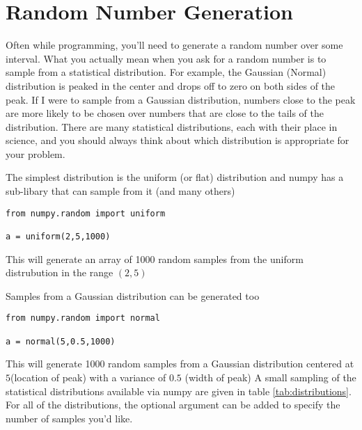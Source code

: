 \section{Random Number Generation}
Often while programming, you'll need to generate a random number over
some interval.  What you actually mean when you ask for a random
number is to sample from a statistical distribution.  For example, the
Gaussian (Normal) distribution is peaked in the center and drops off
to zero on both sides of the peak.  If I were to sample from a Gaussian
distribution, numbers close to the peak are more likely to be chosen
over numbers that are close to the tails of the distribution.  There
are many statistical distributions, each with their place in science,
and you should always think about which distribution is appropriate
for your problem.  

The simplest distribution is the uniform (or flat) distribution and
numpy has a sub-libary that can sample from it (and many others)

\begin{Verbatim}
from numpy.random import uniform

a = uniform(2,5,1000)
\end{Verbatim}

This will generate an array of 1000 random samples from the uniform
distrubution in the range $(2,5)$

Samples from a Gaussian distribution can be generated too

\begin{Verbatim}
from numpy.random import normal

a = normal(5,0.5,1000)
\end{Verbatim}

This will generate 1000 random samples from a Gaussian distribution
centered at $5$(location of peak) with a variance of $0.5$ (width of peak)
A small sampling of the statistical distributions available via numpy
are given in table \ref{tab:distributions}.  For all of the
distributions, the optional argument  can be added to
specify the number of samples you'd like.

